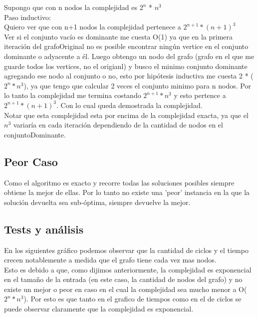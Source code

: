 Supongo que con n nodos la complejidad es $2^n$ * $n^3$\\

Paso inductivo:\\

Quiero ver que con n+1 nodos la complejidad pertenece a $2^{n+1}*(n+1)^3$\\

Ver si el conjunto vacío es dominante me cuesta O(1) ya que en la primera iteración del grafoOriginal no es posible encontrar ningún vertice en el conjunto dominante o adyacente a él. Luego obtengo un nodo del grafo (grafo en el que me guarde todos los vertices, no el origianl) y busco el minimo conjunto dominante agregando ese nodo al conjunto o no, esto por hipótesis inductiva me cuesta 2 * ($2^n * n^3$), ya que tengo que calcular 2 veces el conjunto minimo para n nodos. Por lo tanto la complejidad me termina costando  $2^{n+1}*n^3$ y esto pertence a $2^{n+1}*(n+1)^3$. Con lo cual queda demostrada la complejidad.\\

Notar que esta complejidad esta por encima de la complejidad exacta, ya que el $n^3$ variaría en cada iteración dependiendo de la cantidad de nodos en el conjuntoDominante.

\subsection{Peor Caso}

Como el algoritmo es exacto y recorre todas las soluciones posibles siempre obtiene la mejor de ellas. Por lo tanto no existe una 'peor' instancia
en la que la solución devuelta sea sub-óptima, siempre devuelve la mejor.

\subsection{Tests y análisis}
En los siguientes gráfico podemos observar que la cantidad de ciclos y el tiempo crecen notablemente a medida que el grafo tiene cada vez mas nodos.\\
Esto es debido a que, como dijimos anteriormente, la complejidad es exponencial en el tamaño de la entrada (en este caso, la cantidad de nodos 
del grafo) y no existe un mejor o peor en caso en el cual la complejidad sea mucho menor a O($2^n*n^3$). Por esto es que tanto en el grafico de tiempos
 como en el de ciclos se puede observar claramente que la complejidad es exponencial.

